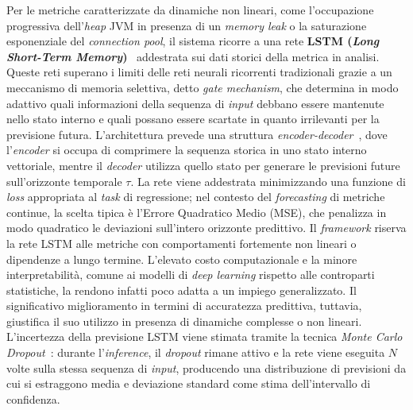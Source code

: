 Per le metriche caratterizzate da dinamiche non lineari, come l'occupazione progressiva
dell'\textit{heap} \gls{JVM} in presenza di un \textit{memory leak} o la saturazione esponenziale
del \textit{connection pool}, il sistema ricorre a una rete \textbf{LSTM (\textit{Long
Short-Term Memory})}~\cite{hochreiter1997} addestrata sui dati storici della metrica in analisi.
Queste reti superano i limiti delle reti neurali ricorrenti tradizionali grazie a un meccanismo di
memoria selettiva, detto \textit{gate mechanism}, che determina in modo adattivo quali informazioni
della sequenza di \textit{input} debbano essere mantenute nello stato interno e quali possano
essere scartate in quanto irrilevanti per la previsione futura.
L'architettura prevede una struttura \textit{encoder-decoder}~\cite{sutskever2014}, dove l'\textit{encoder}
si occupa di comprimere la sequenza storica in uno stato interno vettoriale, mentre il
\textit{decoder} utilizza quello stato per generare le previsioni future sull'orizzonte temporale
$\tau$. La rete viene addestrata minimizzando una funzione di \textit{loss} appropriata al
\textit{task} di regressione; nel contesto del \textit{forecasting} di metriche continue, la
scelta tipica è l'Errore Quadratico Medio (\gls{MSE}), che penalizza in modo quadratico le
deviazioni sull'intero orizzonte predittivo.
Il \textit{framework} riserva la rete LSTM alle metriche con comportamenti fortemente non lineari o
dipendenze a lungo termine. L'elevato costo computazionale e la minore interpretabilità, comune ai
modelli di \textit{deep learning} rispetto alle controparti statistiche, la rendono infatti poco
adatta a un impiego generalizzato. Il significativo miglioramento in termini di accuratezza
predittiva, tuttavia, giustifica il suo utilizzo in presenza di dinamiche complesse o non lineari.
L'incertezza della previsione LSTM viene stimata tramite la tecnica \textit{Monte Carlo
Dropout}~\cite{gal2016}: durante l'\textit{inference}, il \textit{dropout} rimane attivo e la rete
viene eseguita $N$ volte sulla stessa sequenza di \textit{input}, producendo una distribuzione di
previsioni da cui si estraggono media e deviazione standard come stima dell'intervallo di
confidenza.

